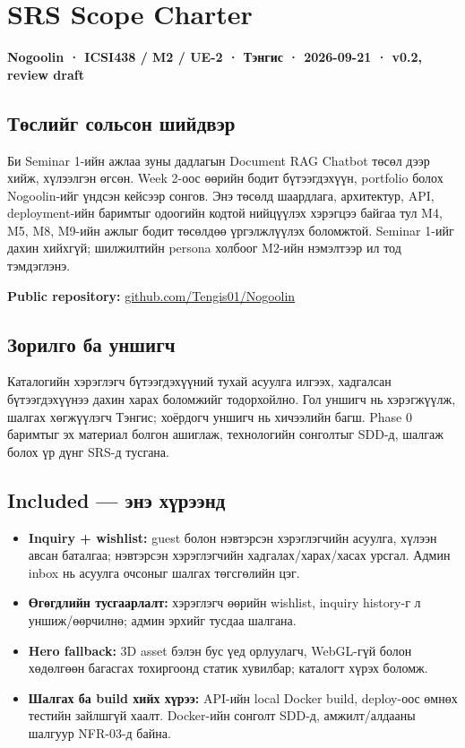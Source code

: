 \section{SRS Scope Charter}\label{doc1-srs-scope-charter}

\textbf{Nogoolin · ICSI438 / M2 / UE-2 · Тэнгис · 2026-09-21 · v0.2,
review draft}

\subsection{Төслийг сольсон
шийдвэр}\label{doc1-ux442ux4e9ux441ux43bux438ux439ux433-ux441ux43eux43bux44cux441ux43eux43d-ux448ux438ux439ux434ux432ux44dux440}

Би Seminar 1-ийн ажлаа зуны дадлагын Document RAG Chatbot төсөл дээр
хийж, хүлээлгэн өгсөн. Week 2-оос өөрийн бодит бүтээгдэхүүн, portfolio
болох Nogoolin-ийг үндсэн кейсээр сонгов. Энэ төсөлд шаардлага,
архитектур, API, deployment-ийн баримтыг одоогийн кодтой нийцүүлэх
хэрэгцээ байгаа тул M4, M5, M8, M9-ийн ажлыг бодит төсөлдөө үргэлжлүүлэх
боломжтой. Seminar 1-ийг дахин хийхгүй; шилжилтийн persona холбоог
M2-ийн нэмэлтээр ил тод тэмдэглэнэ.

\textbf{Public repository:}
\href{https://github.com/Tengis01/Nogoolin}{github.com/Tengis01/Nogoolin}

\subsection{Зорилго ба
уншигч}\label{doc1-ux437ux43eux440ux438ux43bux433ux43e-ux431ux430-ux443ux43dux448ux438ux433ux447}

Каталогийн хэрэглэгч бүтээгдэхүүний тухай асуулга илгээх, хадгалсан
бүтээгдэхүүнээ дахин харах боломжийг тодорхойлно. Гол уншигч нь
хэрэгжүүлж, шалгах хөгжүүлэгч Тэнгис; хоёрдогч уншигч нь хичээлийн багш.
Phase 0 баримтыг эх материал болгон ашиглаж, технологийн сонголтыг
SDD-д, шалгаж болох үр дүнг SRS-д тусгана.

\subsection{Included --- энэ
хүрээнд}\label{doc1-included-ux44dux43dux44d-ux445ux4afux440ux44dux44dux43dux434}

\begin{itemize}
\tightlist
\item
  \textbf{Inquiry + wishlist:} guest болон нэвтэрсэн хэрэглэгчийн
  асуулга, хүлээн авсан баталгаа; нэвтэрсэн хэрэглэгчийн
  хадгалах/харах/хасах урсгал. Админ inbox нь асуулга очсоныг шалгах
  төгсгөлийн цэг.
\item
  \textbf{Өгөгдлийн тусгаарлалт:} хэрэглэгч өөрийн wishlist, inquiry
  history-г л уншиж/өөрчилнө; админ эрхийг тусдаа шалгана.
\item
  \textbf{Hero fallback:} 3D asset бэлэн бус үед орлуулагч, WebGL-гүй
  болон хөдөлгөөн багасгах тохиргоонд статик хувилбар; каталогт хүрэх
  боломж.
\item
  \textbf{Шалгах ба build хийх хүрээ:} API-ийн local Docker build,
  deploy-оос өмнөх тестийн зайлшгүй хаалт. Docker-ийн сонголт SDD-д,
  амжилт/алдааны шалгуур NFR-03-д байна.
\end{itemize}

